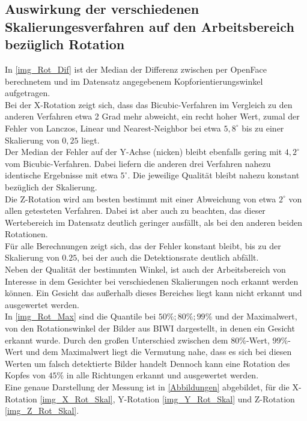 \subsection{Auswirkung der verschiedenen Skalierungesverfahren auf den Arbeitsbereich bezüglich Rotation}
In \autoref{img_Rot_Dif} ist der Median der Differenz zwischen per OpenFace berechnetem und im Datensatz angegebenem Kopforientierungswinkel aufgetragen.\\
Bei der X-Rotation zeigt sich, dass das Bicubic-Verfahren im Vergleich zu den anderen Verfahren etwa 2 Grad mehr abweicht, ein recht hoher Wert, zumal der Fehler von Lanczos, Linear und Nearest-Neighbor bei etwa $5,8^\circ$ bis zu einer Skalierung von $0,25$ liegt.\\
Der Median der Fehler auf der Y-Achse (nicken) bleibt ebenfalls gering mit $4,2^\circ$ vom Bicubic-Verfahren. Dabei liefern die anderen drei Verfahren nahezu identische Ergebnisse mit etwa $5^\circ$. Die jeweilige Qualität bleibt nahezu konstant bezüglich der Skalierung.\\
Die Z-Rotation wird am besten bestimmt mit einer Abweichung von etwa $2^\circ$ von allen getesteten Verfahren. Dabei ist aber auch zu beachten, das dieser Wertebereich im Datensatz deutlich geringer ausfällt, als bei den anderen beiden Rotationen.\\
Für alle Berechnungen zeigt sich, das der Fehler konstant bleibt, bis zu der Skalierung von $0.25$, bei der auch die Detektionsrate deutlich abfällt.\\
Neben der Qualität der bestimmten Winkel, ist auch der Arbeitsbereich von Interesse in dem Gesichter bei verschiedenen Skalierungen noch erkannt werden können. Ein Gesicht das außerhalb dieses Bereiches liegt kann nicht erkannt und ausgewertet werden.\\
In \autoref{img_Rot_Max} sind die Quantile bei $50\%; 80\%; 99\%$ und der Maximalwert, von den Rotationswinkel der Bilder aus BIWI \cite{database_Face_Ori} dargestellt, in denen ein Gesicht erkannt wurde. Durch den großen Unterschied zwischen dem $80\%$-Wert, $99\%$-Wert und dem Maximalwert liegt die Vermutung nahe, dass es sich bei diesen Werten um falsch detektierte Bilder handelt Dennoch kann eine Rotation des Kopfes von $45\%$ in alle Richtungen erkannt und ausgewertet werden.\\
Eine genaue Darstellung der Messung ist in \autoref{Abbildungen} abgebildet, für die X-Rotation \autoref{img_X_Rot_Skal}, Y-Rotation \autoref{img_Y_Rot_Skal} und Z-Rotation \autoref{img_Z_Rot_Skal}.
